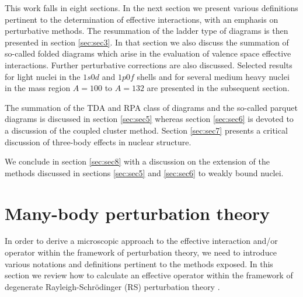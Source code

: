 \documentclass{article}
\begin{document}
This work falls in eight sections.
In the next section we present various definitions pertinent
to the determination of effective interactions, with an emphasis
on perturbative methods.
The resummation of the ladder type of
diagrams is then presented in section \ref{sec:sec3}.
In that section we also discuss the summation of so-called
folded diagrams which arise in the evaluation of
valence space effective interactions. Further perturbative
corrections are also discussed. Selected results
for light nuclei in the $1s0d$ and $1p0f$ shells and for
several medium heavy nuclei in the mass region $A=100$ to $A=132$
are presented in the subsequent section.

The summation of the TDA and RPA class of diagrams and the so-called
parquet diagrams is discussed in
section \ref{sec:sec5} whereas section \ref{sec:sec6} is devoted to a discussion
of the coupled cluster method. Section \ref{sec:sec7} presents a critical discussion
of three-body effects in nuclear structure.

We conclude in section \ref{sec:sec8} with a discussion
on the extension of the methods discussed in sections \ref{sec:sec5} and
\ref{sec:sec6} to weakly bound nuclei.   



\section{Many-body perturbation theory}
\label{sec:sec2}


In order to derive a microscopic approach to the effective interaction and/or operator
within the framework of perturbation theory, we need to introduce various
notations and definitions pertinent to the methods exposed.
In this section we review how to calculate an effective
operator within the framework of
degenerate Rayleigh-Schr\"{o}dinger
(RS) perturbation theory \cite{ko90,lm85}.
\end{document}
